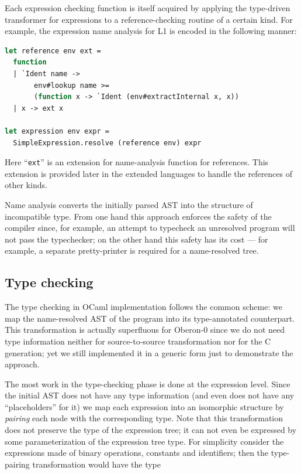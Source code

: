 Each expression checking function is itself acquired by applying the type-driven transformer 
for expressions to a reference-checking routine of a certain kind. For example, the expression 
name analysis for L1 is encoded in the following manner:

\begin{lstlisting}[language=ocaml]
let reference env ext = 
  function
  | `Ident name -> 
       env#lookup name >= 
       (function x -> `Ident (env#extractInternal x, x))
  | x -> ext x

let expression env expr = 
  SimpleExpression.resolve (reference env) expr 
\end{lstlisting}

Here ``\lstinline{ext}'' is an extension for name-analysis function for references. This 
extension is provided later in the extended languages to handle the references of other kinds.

Name analysis converts the initially parsed AST into the structure of incompatible 
type. From one hand this approach enforces the safety of the compiler since, for example, an attempt
to typecheck an unresolved program will not pass the typechecker; on the other hand this
safety has its cost --- for example, a separate pretty-printer is required for a
name-resolved tree. 

\subsection{Type checking}

The type checking in OCaml implementation follows the common scheme: we map the name-resolved
AST of the program into its type-annotated counterpart. This transformation is
actually superfluous for Oberon-0 since we do not need type information neither for
source-to-source transformation nor for the C generation; yet we still implemented it in
a generic form just to demonstrate the approach.

The most work in the type-checking phase is done at the expression level. Since the 
initial AST does not have any type information (and even does not have any ``placeholders'' 
for it) we map each expression into an isomorphic structure by \emph{pairing} each node 
with the corresponding type. Note that this transformation does not preserve the type of
the expression tree; it can not even be expressed by some parameterization of the
expression tree type. For simplicity consider the expressions made of binary operations,
constants and identifiers; then the type-pairing transformation would have the type

